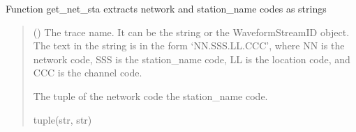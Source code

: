 \documentclass[letterpaper,10pt,english]{sphinxmanual}
\begin{document}

\begin{fulllineitems}
\label{\detokenize{api_core:amw.core.utils.get_net_sta}}
\pysigstartsignatures
{}
\pysigstopsignatures
\sphinxAtStartPar
Function get\_net\_sta extracts network and station\_name codes as strings
\begin{quote}\begin{description}
\sphinxAtStartPar
{} () \textendash{} The trace name. It can be the string or the WaveformStreamID object.
The text in the string is in the form ‘NN.SSS.LL.CCC’, where NN is the network code,
SSS is the station\_name code, LL is the location code, and CCC is the channel code.

\sphinxAtStartPar
The tuple of the network code the station\_name code.

\sphinxAtStartPar
tuple(str, str)

\end{description}\end{quote}

\end{fulllineitems}

\end{document}
